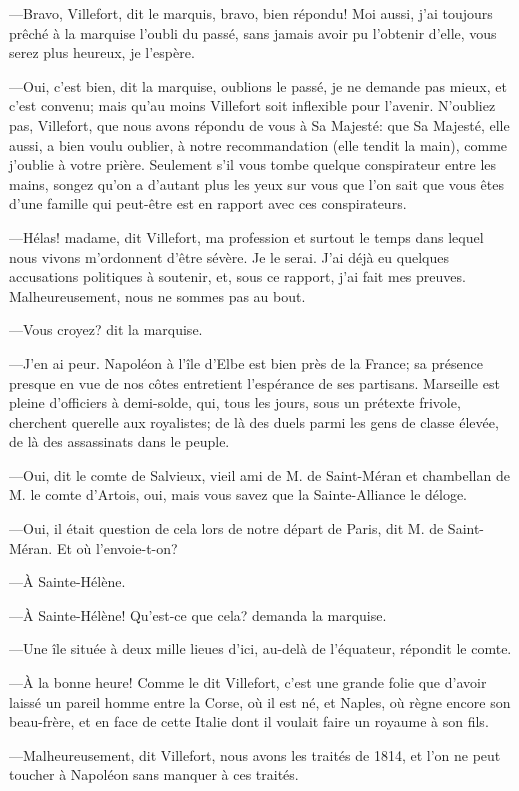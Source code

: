 —Bravo, Villefort, dit le marquis, bravo, bien répondu! Moi aussi, j'ai toujours prêché à la marquise l'oubli du passé, sans jamais avoir pu l'obtenir d'elle, vous serez plus heureux, je l'espère.

—Oui, c'est bien, dit la marquise, oublions le passé, je ne demande pas mieux, et c'est convenu; mais qu'au moins Villefort soit inflexible pour l'avenir. N'oubliez pas, Villefort, que nous avons répondu de vous à Sa Majesté: que Sa Majesté, elle aussi, a bien voulu oublier, à notre recommandation (elle tendit la main), comme j'oublie à votre prière. Seulement s'il vous tombe quelque conspirateur entre les mains, songez qu'on a d'autant plus les yeux sur vous que l'on sait que vous êtes d'une famille qui peut-être est en rapport avec ces conspirateurs.

—Hélas! madame, dit Villefort, ma profession et surtout le temps dans lequel nous vivons m'ordonnent d'être sévère. Je le serai. J'ai déjà eu quelques accusations politiques à soutenir, et, sous ce rapport, j'ai fait mes preuves. Malheureusement, nous ne sommes pas au bout.

—Vous croyez? dit la marquise.

—J'en ai peur. Napoléon à l'île d'Elbe est bien près de la France; sa présence presque en vue de nos côtes entretient l'espérance de ses partisans. Marseille est pleine d'officiers à demi-solde, qui, tous les jours, sous un prétexte frivole, cherchent querelle aux royalistes; de là des duels parmi les gens de classe élevée, de là des assassinats dans le peuple.

—Oui, dit le comte de Salvieux, vieil ami de M. de Saint-Méran et chambellan de M. le comte d'Artois, oui, mais vous savez que la Sainte-Alliance le déloge.

—Oui, il était question de cela lors de notre départ de Paris, dit M. de Saint-Méran. Et où l'envoie-t-on?

—À Sainte-Hélène.

—À Sainte-Hélène! Qu'est-ce que cela? demanda la marquise.

—Une île située à deux mille lieues d'ici, au-delà de l'équateur, répondit le comte.

—À la bonne heure! Comme le dit Villefort, c'est une grande folie que d'avoir laissé un pareil homme entre la Corse, où il est né, et Naples, où règne encore son beau-frère, et en face de cette Italie dont il voulait faire un royaume à son fils.

—Malheureusement, dit Villefort, nous avons les traités de 1814, et l'on ne peut toucher à Napoléon sans manquer à ces traités.

